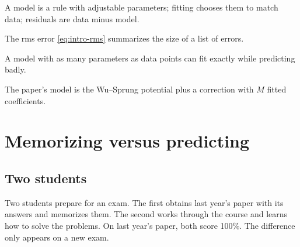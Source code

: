 \begin{keyideas}
\item A model is a rule with adjustable parameters; fitting chooses them to match data; residuals are data minus model.
\item The rms error \cref{eq:intro-rms} summarizes the size of a list of errors.
\item A model with as many parameters as data points can fit exactly while predicting badly.
\item The paper's model is the Wu--Sprung potential plus a correction with $M$ fitted coefficients.
\end{keyideas}

\section{Memorizing versus predicting}\label{sec:intro-memorize}

\subsection{Two students}

Two students prepare for an exam. The first obtains last year's paper with its answers and memorizes them. The second works through the course and learns how to solve the problems. On last year's paper, both score 100\%. The difference only appears on a new exam.


